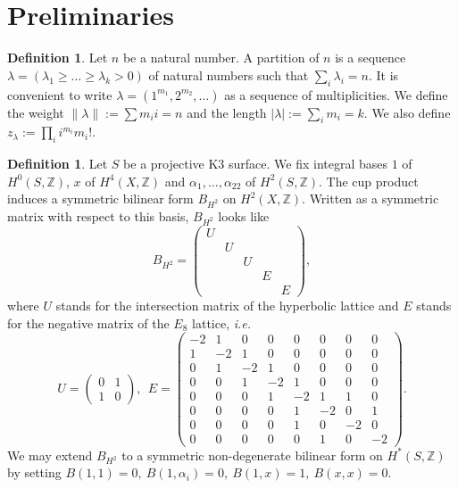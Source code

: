 \documentclass{amsart}
\newcommand{\ie}{{\it i.e. }}
\newcommand{\coloneqq}{:=}
\newcommand{\IZ}{\mathbb{Z}}
\theoremstyle{plain}
\theoremstyle{definition}
\newtheorem{definition}[theorem]{Definition}
\theoremstyle{remark}
\begin{document}
\section{Preliminaries}
\begin{definition}
Let $n$ be a natural number. A partition of $n$ is a sequence $\lambda = (\lambda_1\geq\ldots\geq\lambda_k>0)$ of natural numbers such that $\sum_i \lambda_i =n$. It is convenient to write $\lambda = (1^{m_1},2^{m_2},\ldots)$ as a sequence of multiplicities. We define the weight $\|\lambda\| :=\sum m_i i =n$ and the length $|\lambda| := \sum_i m_i =k$. We also define $z_\lambda \coloneqq\prod_i i^{m_i} m_i!$. 
\end{definition}
\begin{definition}
Let $S$ be a projective K3 surface. We fix integral bases $1$ of $H^0(S,\IZ)$, $x$ of $H^4(X,\IZ)$ and $\alpha_1,\ldots ,\alpha_{22}$ of $H^2(S,\IZ)$. The cup product induces a symmetric bilinear form $B_{H^2}$ on $H^2(X,\IZ)$. Written as a symmetric matrix with respect to this basis, $B_{H^2}$ looks like
$$ B_{H^2} =
\left(\begin{array}{ccccc}
U&&&& \\
&U&&& \\
&&U&& \\
&&&E& \\
&&&&E \end{array}\right),
$$
where $U$ stands for the intersection matrix of the hyperbolic lattice and $E$ stands for the negative matrix of the $E_8$ lattice, \ie 
\begin{equation*}
U = 
\left(\begin{array}{cc}
0&1\\1&0 \end{array}\right),
\ \ E = \left(\begin{array}{cccccccc}
-2&1&0&0&0&0&0&0\\1&-2&1&0&0&0&0&0\\0&1&-2&1&0&0&0&0\\0&0&1&-2&1&0&0&0\\0&0&0&1&-2&1&1&0\\0&0&0&0&1&-2&0&1\\0&0&0&0&1&0&-2&0\\0&0&0&0&0&1&0&-2
\end{array}\right).
\end{equation*}
We may extend $B_{H^2}$ to a symmetric non-degenerate bilinear form on $H^\ast(S,\IZ)$ by setting $ B(1,1) = 0,\ B(1,\alpha_i) = 0,\ B(1,x) = 1, \ B(x,x) = 0$.
\end{definition}
\end{document}
